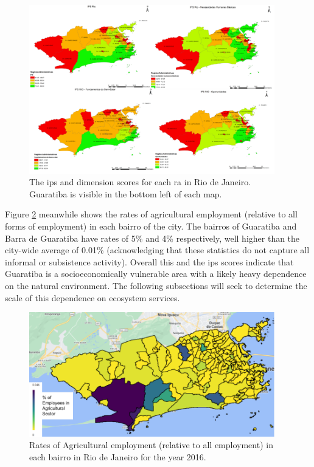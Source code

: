 \begin{figure}[!htb] 
\centering
\includegraphics[width=0.95\textwidth]{Figures/chap4/ips_maps.png}
\caption[Map of Social Progress Indicator for Rio de Janeiro]{The \acf{ips} and dimension scores for each \ac{ra} in Rio de Janeiro. Guaratiba is visible in the bottom left of each map.}
\label{fig:ips_maps}
\end{figure}

Figure \ref{fig:agriculture_employment} meanwhile shows the rates of agricultural employment (relative to all forms of employment) in each bairro of the city. The bairros of Guaratiba and Barra de Guaratiba have rates of 5\% and 4\% respectively, well higher than the city-wide average of 0.01\% (acknowledging that these statistics do not capture all informal or subsistence activity). Overall this and the \ac{ips} scores indicate that Guaratiba is a socioeconomically vulnerable area with a likely heavy dependence on the natural environment. The following subsections will seek to determine the scale of this dependence on ecosystem services.

\begin{figure}[!htb] 
\centering
\includegraphics[width=0.95\textwidth]{Figures/chap4/agriculture_employment.png}
\caption[Agricultural Employment Across Rio de Janeiro]{Rates of Agricultural employment (relative to all employment) in each bairro in Rio de Janeiro for the year 2016.}
\label{fig:agriculture_employment}
\end{figure}


